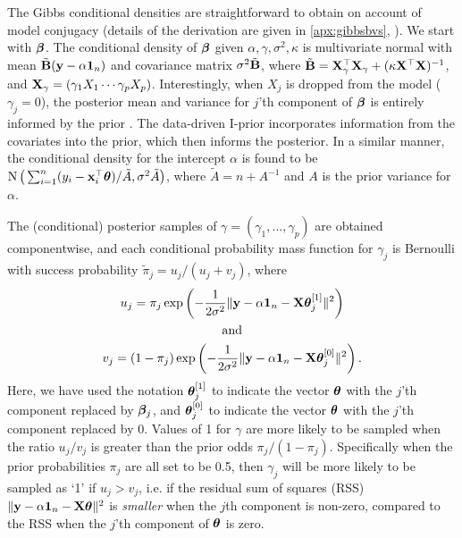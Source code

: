 \documentclass[showframe,11pt,twoside,openright]{report}
\begin{document}
The Gibbs conditional densities are straightforward to obtain on account of model conjugacy (details of the derivation are given in \cref{apx:gibbsbvs}, ).
We start with ${\bm\beta}$. 
The conditional density of ${\bm\beta}$ given $\alpha,\gamma,\sigma^2,\kappa$ is multivariate normal with mean $\tilde {{\mathbf B}}({\mathbf y}-\alpha{\mathbf 1}_n)$ and covariance matrix $\sigma^2\tilde {{\mathbf B}}$, where $\tilde {{\mathbf B}} = {\mathbf X}_\gamma^\top {\mathbf X}_\gamma + (\kappa \mathbf X^\top \mathbf X)^{-1}$, and ${\mathbf X}_\gamma = (\gamma_1X_1 \cdots \gamma_pX_p)$.
Interestingly, when $X_j$ is dropped from the model ($\gamma_j=0$), the posterior mean and variance for $j$'th component of ${\bm\beta}$ is entirely informed by the prior \citep{Kuo1998}.
The data-driven I-prior incorporates information from the covariates into the prior, which then informs the posterior.
In a similar manner, the conditional density for the intercept $\alpha$ is found to be $\operatorname{N}\big( \sum_{i=1}^n(y_i - {\mathbf x}_i^\top{\bm\theta}) / \tilde A,\sigma^2\tilde A \big)$, where $\tilde A = n + A^{-1}$ and $A$ is the prior variance for $\alpha$.

The (conditional) posterior samples of $\gamma=(\gamma_1,\dots,\gamma_p)$ are obtained componentwise, and each conditional probability mass function for $\gamma_j$ is Bernoulli  with success probability $\tilde \pi_j = u_j / (u_j + v_j)$, where
\begin{align*}
  \begin{gathered}
    u_j = \pi_j \exp\left( - \frac{1}{2\sigma^2} \Vert {\mathbf y} - \alpha {\mathbf 1}_n - {\mathbf X}{\bm\theta}_j^{[1]} \Vert^2 \right) \\
    \text{and} \\
    v_j = (1-\pi_j) \exp\left( - \frac{1}{2\sigma^2} \Vert {\mathbf y} - \alpha {\mathbf 1}_n - {\mathbf X}{\bm\theta}_j^{[0]} \Vert^2 \right).
  \end{gathered}
\end{align*}
Here, we have used the notation ${\bm\theta}_j^{[1]}$ to indicate the vector ${\bm\theta}$ with the $j$'th component replaced by ${\bm\beta}_j$, and ${\bm\theta}_j^{[0]}$ to indicate the vector ${\bm\theta}$ with the $j$'th component replaced by 0.
Values of 1 for $\gamma$ are more likely to be sampled when the ratio $u_j / v_j$ is greater than the prior odds $\pi_j/(1-\pi_j)$.
Specifically when the prior probabilities $\pi_j$ are all set to be 0.5, then $\gamma_j$ will be more likely to be sampled as `1' if $u_j > v_j$, i.e. if the residual sum of squares (RSS) $\Vert {\mathbf y} - \alpha{\mathbf 1}_n - {\mathbf X}{\bm\theta} \Vert^2$ is \emph{smaller} when the $j$th component is non-zero, compared to the RSS when the $j$'th component of ${\bm\theta}$ is zero.
\end{document}
